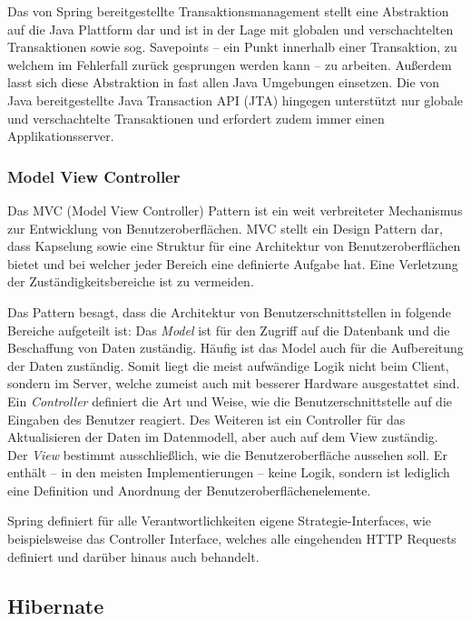 				Das von Spring bereitgestellte Transaktionsmanagement stellt eine Abstraktion auf die Java Plattform dar und ist in der Lage mit globalen und verschachtelten Transaktionen sowie sog. Savepoints -- ein Punkt innerhalb einer Transaktion, zu welchem im Fehlerfall zurück gesprungen werden kann -- zu arbeiten. Außerdem lasst sich diese Abstraktion in fast allen Java Umgebungen einsetzen. Die von Java bereitgestellte Java Transaction API (\ac{JTA}) hingegen unterstützt nur globale und verschachtelte Transaktionen und erfordert zudem immer einen Applikationsserver. 
			
			\subsubsection{Model View Controller} %
			
				Das \ac{MVC} (Model View Controller) Pattern ist ein weit verbreiteter Mechanismus zur Entwicklung von Benutzeroberflächen. \ac{MVC} stellt ein Design Pattern dar, dass Kapselung sowie eine Struktur für eine Architektur von Benutzeroberflächen bietet und bei welcher jeder Bereich eine definierte Aufgabe hat. Eine Verletzung der Zuständigkeitsbereiche ist zu vermeiden. \cite{Gamma.1995}
			
				Das Pattern besagt, dass die Architektur von Benutzerschnittstellen in folgende Bereiche aufgeteilt ist: Das \textit{Model} ist für den Zugriff auf die Datenbank und die Beschaffung von Daten zuständig. Häufig ist das Model auch für die Aufbereitung der Daten zuständig. Somit liegt die meist aufwändige Logik nicht beim Client, sondern im Server, welche zumeist auch mit besserer Hardware ausgestattet sind. \\
				Ein \textit{Controller} definiert die Art und Weise, wie die Benutzerschnittstelle auf die Eingaben des Benutzer reagiert. Des Weiteren ist ein Controller für das Aktualisieren der Daten im Datenmodell, aber auch auf dem View zuständig. \\
				Der \textit{View} bestimmt ausschließlich, wie die Benutzeroberfläche aussehen soll. Er enthält -- in den meisten Implementierungen -- keine Logik, sondern ist lediglich eine Definition und Anordnung der Benutzeroberflächenelemente.
				
				Spring definiert für alle Verantwortlichkeiten eigene Strategie-Interfaces, wie beispielsweise das Controller Interface, welches alle eingehenden \ac{HTTP} Requests definiert und darüber hinaus auch behandelt. 

		
		\subsection{Hibernate} %
		
